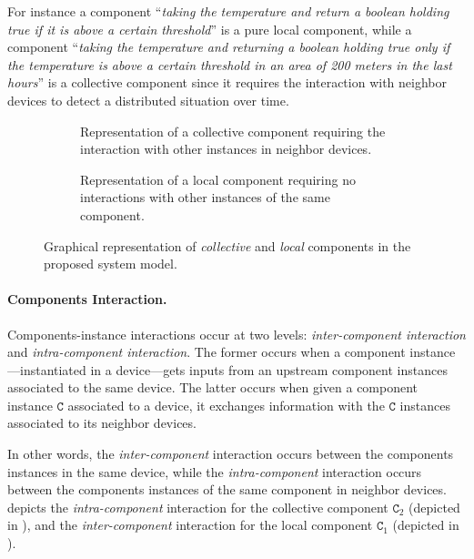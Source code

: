 For instance a component ``\emph{taking the temperature and return a boolean holding true if it is above a certain threshold}'' 
 is a pure local component, while a component ``\emph{taking the temperature and returning a boolean holding true only 
 if the temperature is above a certain threshold in an area of 200 meters in the last hours}''
 is a collective component since it requires the interaction with neighbor devices to detect a distributed situation over time. 

\begin{figure}
  \centering

  \begin{subfigure}{0.45\textwidth}
    \centering
    \resizebox{\linewidth}{!}{%
    }
    \caption{
      Representation of a collective component requiring the interaction
      with other instances in neighbor devices.
    }
    \label{fig:collective-component}
  \end{subfigure}
  \hfill
  \begin{subfigure}{0.45\textwidth}
    \centering
    \resizebox{\linewidth}{!}{%
    }
    \caption{
      Representation of a local component requiring no interactions
      with other instances of the same component.
    }
    \label{fig:local-component}
  \end{subfigure}

  \caption{
    Graphical representation of \emph{collective} and \emph{local}
    components in the proposed system model.
  }
  \label{fig:collective-local-components}
\end{figure}

\paragraph{Components Interaction.}
Components-instance interactions occur at two levels:
 \emph{inter-component interaction} and \emph{intra-component interaction}.
%
The former occurs when a component instance---instantiated in a device---gets inputs 
 from an upstream component instances associated to the same device.
%
The latter occurs when given a component instance $\mathtt{C}$ associated to a device,
 it exchanges information with the $\mathtt{C}$ instances associated to its neighbor devices.

In other words,
 the \emph{inter-component} interaction occurs between the components instances in the same device,
 while the \emph{intra-component} interaction occurs between the components instances of the same component in neighbor devices.
%
 depicts the \emph{intra-component} interaction 
 for the collective component $\mathtt{C}_2$ (depicted in ),
 and the \emph{inter-component} interaction for the local component $\texttt{C}_1$ (depicted in ).

